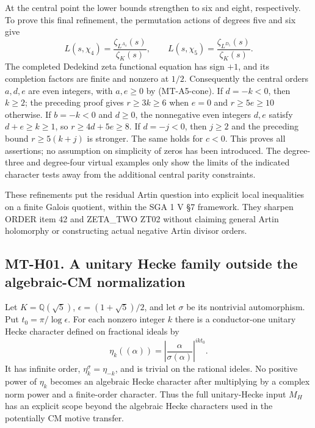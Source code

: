 \documentclass[11pt,a4paper]{article}
\begin{document}
At the central point the lower bounds strengthen to six and eight,
respectively. To prove this final refinement, the permutation actions
of degrees five and six give
\[
 L(s,\chi_4)=\frac{\zeta_{L^{A_4}}(s)}{\zeta_K(s)},\qquad
 L(s,\chi_5)=\frac{\zeta_{L^{D_5}}(s)}{\zeta_K(s)}.
\]
The completed Dedekind zeta functional equation has sign $+1$, and
its completion factors are finite and nonzero at $1/2$. Consequently
the central orders $a,d,e$ are even integers, with $a,e\ge0$ by
(MT-A5-cone). If $d=-k<0$, then $k\ge2$; the preceding proof gives
$r\ge3k\ge6$ when $e=0$ and $r\ge5e\ge10$ otherwise.
If $b=-k<0$ and $d\ge0$, the nonnegative even integers $d,e$
satisfy $d+e\ge k\ge1$, so $r\ge4d+5e\ge8$.
If $d=-j<0$, then $j\ge2$ and the preceding bound
$r\ge5(k+j)$ is stronger. The same holds for $c<0$.
This proves all assertions; no assumption on simplicity of zeros has
been introduced. The degree-three and degree-four virtual examples
only show the limits of the indicated character tests away from the
additional central parity constraints.

These refinements put the residual Artin question into explicit local
inequalities on a finite Galois quotient, within the SGA 1 V \S7
framework. They sharpen ORDER item 42 and ZETA\_TWO ZT02 without
claiming general Artin holomorphy or constructing actual negative
Artin divisor orders.

\subsection*{MT-H01. A unitary Hecke family outside the algebraic-CM normalization}
Let $K=\mathbb Q(\sqrt5)$, $\epsilon=(1+\sqrt5)/2$, and let $\sigma$
be its nontrivial automorphism. Put $t_0=\pi/\log\epsilon$.
For each nonzero integer $k$ there is a conductor-one unitary Hecke
character defined on fractional ideals by
\[
       \eta_k((\alpha))=
       \left|\frac{\alpha}{\sigma(\alpha)}\right|^{ik t_0}.
                                                               \tag{MT-H1}
\]
It has infinite order, $\eta_k^\sigma=\eta_{-k}$, and is trivial
on the rational ideles. No positive power of $\eta_k$ becomes an
algebraic Hecke character after multiplying by a complex norm power
and a finite-order character. Thus the full unitary-Hecke input $M_H$
has an explicit scope beyond the algebraic Hecke characters used in
the potentially CM motive transfer.
\end{document}
